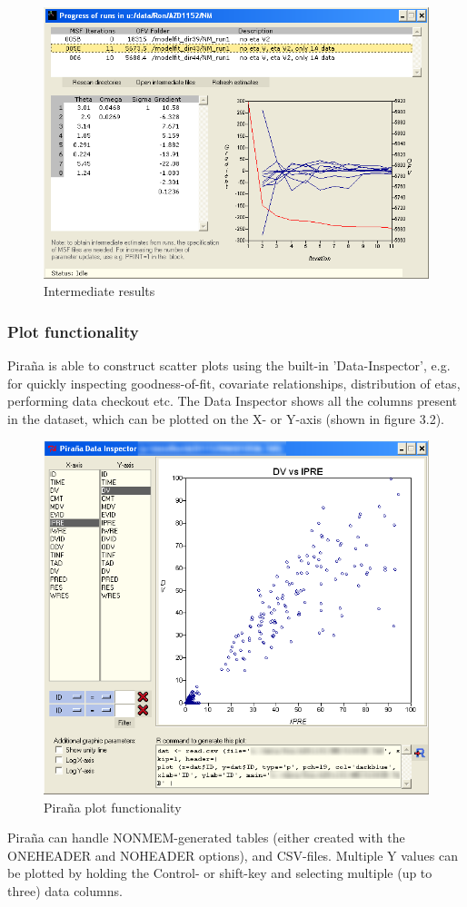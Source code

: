 \documentclass[a4,11pt]{report} \usepackage[pdftex]{graphicx}
\begin{document}
{\begin{figure}[hbt] \centering
    \includegraphics[scale=0.3]{images/intermed.png}
    \caption{Intermediate results}
\end{figure}

\subsubsection*{Plot functionality} Pira\~na is able to construct
scatter plots using the built-in 'Data-Inspector', e.g. for quickly
inspecting goodness-of-fit, covariate relationships, distribution of
etas, performing data checkout etc. The Data Inspector shows all the
columns present in the dataset, which can be plotted on the X- or
Y-axis (shown in figure 3.2).
\begin{figure}[hbt] \centering
    \includegraphics[scale=0.3]{images/plot.png}
    \caption{Pira\~na plot functionality}
\end{figure} Pira\~na can handle NONMEM-generated tables (either created with the
ONEHEADER and NOHEADER options), and CSV-files. Multiple Y values can
be plotted by holding the Control- or shift-key and selecting multiple
(up to three) data columns.

}
\end{document}
